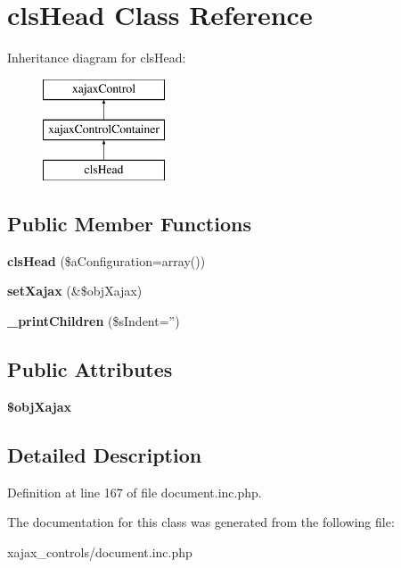 \hypertarget{classclsHead}{
\section{clsHead Class Reference}
\label{classclsHead}
}
Inheritance diagram for clsHead:\begin{figure}[H]
\begin{center}
\leavevmode
\includegraphics[height=3.000000cm]{classclsHead}
\end{center}
\end{figure}
\subsection*{Public Member Functions}
\begin{DoxyCompactItemize}
\item 
\hypertarget{classclsHead_a3b45efa7b4d4dd5f23b3ecaf8374e1f7}{
{\bfseries clsHead} (\$aConfiguration=array())}
\label{classclsHead_a3b45efa7b4d4dd5f23b3ecaf8374e1f7}

\item 
\hypertarget{classclsHead_ab5b43e8666645ab386e2f968c6f4cc74}{
{\bfseries setXajax} (\&\$objXajax)}
\label{classclsHead_ab5b43e8666645ab386e2f968c6f4cc74}

\item 
\hypertarget{classclsHead_a902dddda68fd8274f4a0b0c5980c6e55}{
{\bfseries \_\-printChildren} (\$sIndent='')}
\label{classclsHead_a902dddda68fd8274f4a0b0c5980c6e55}

\end{DoxyCompactItemize}
\subsection*{Public Attributes}
\begin{DoxyCompactItemize}
\item 
\hypertarget{classclsHead_a6c24c6adc16c9daf5148b7691b817b4b}{
{\bfseries \$objXajax}}
\label{classclsHead_a6c24c6adc16c9daf5148b7691b817b4b}

\end{DoxyCompactItemize}


\subsection{Detailed Description}


Definition at line 167 of file document.inc.php.



The documentation for this class was generated from the following file:\begin{DoxyCompactItemize}
\item 
xajax\_\-controls/document.inc.php\end{DoxyCompactItemize}
